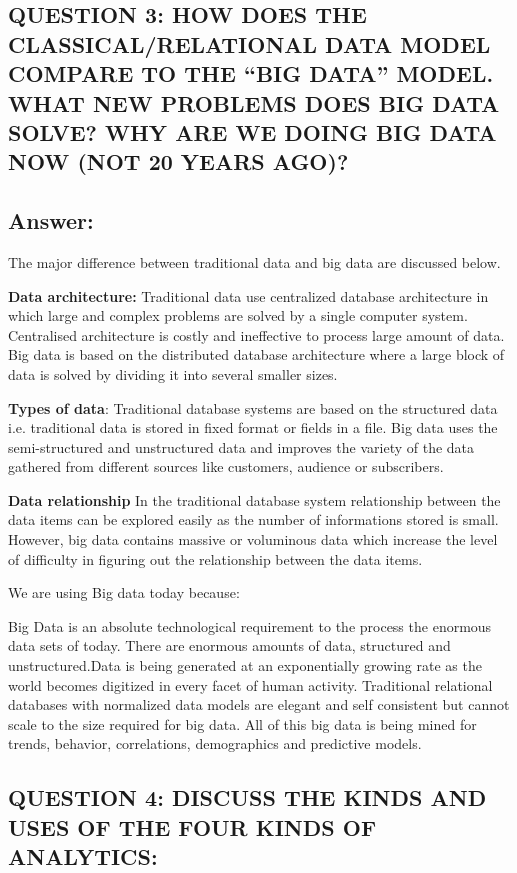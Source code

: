 \documentclass[10 pm]{article}
\begin{document}
	

\subsection{QUESTION 3: HOW DOES THE CLASSICAL/RELATIONAL DATA MODEL COMPARE TO THE “BIG DATA” MODEL. WHAT NEW PROBLEMS DOES BIG DATA SOLVE? WHY ARE WE DOING BIG DATA NOW (NOT 20 YEARS AGO)?}

\subsection*{Answer:}
The major difference between traditional data and big data are discussed below.

\textbf{Data architecture:}
Traditional data use centralized database architecture in which large and complex problems are solved by a single computer system. Centralised architecture is costly and ineffective to process large amount of data. Big data is based on the distributed database architecture where a large block of data is solved by dividing it into several smaller sizes.

\textbf{Types of data}:
Traditional database systems are based on the structured data i.e. traditional data is stored in fixed format or fields in a file. 
Big data uses the semi-structured and unstructured data and improves the variety of the data gathered from different sources like customers, audience or subscribers. 

\textbf{Data relationship}
In the traditional database system relationship between the data items can be explored easily as the number of informations stored is small. However, big data contains massive or voluminous data which increase the level of difficulty in figuring out the relationship between the data items.


We are using Big data today because:

Big Data is an absolute technological requirement to the process the enormous data sets of today.
There are enormous amounts of data, structured and unstructured.Data is being generated at an exponentially growing rate as the world becomes digitized in every facet of human activity.
Traditional relational databases with normalized data models are elegant and self consistent but cannot scale to the size required for big data.
All of this big data is being mined for trends, behavior, correlations, demographics and predictive models.




\subsection{QUESTION 4: DISCUSS THE KINDS AND USES OF THE FOUR KINDS OF ANALYTICS:}
\end{document}
